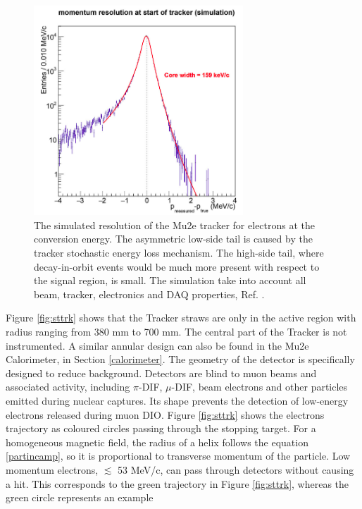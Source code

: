 \begin{figure}[!h]
    \centering
    \includegraphics[width =0.7\textwidth]{figures/png/Screenshot_20240330_104830.png}
    \caption{The simulated resolution of the Mu2e tracker for electrons at the
    conversion energy. The asymmetric low-side tail is caused by the tracker 
    stochastic energy loss mechanism. The high-side tail, where decay-in-orbit 
    events would be much more present with respect to the signal region, is small. 
    The simulation take into account all beam, tracker, electronics and DAQ 
    properties, Ref. \cite{bobbb}.}
    \label{fig:trkres}
    \end{figure}
Figure \ref{fig:sttrk} shows that the Tracker straws are only 
in the active region with radius ranging from 380 mm to 700 mm. 
The central part of the Tracker is not instrumented. A similar annular 
design can also be found in the Mu2e Calorimeter, in Section \ref{calorimeter}. 
The geometry of the detector is specifically designed to reduce background. 
Detectors are blind to muon beams and associated activity, including $\pi$-DIF, 
$\mu$-DIF, beam electrons and other particles emitted during nuclear captures. 
Its shape prevents the detection of low-energy electrons released during muon DIO. 
Figure \ref{fig:sttrk} shows the electrons trajectory as coloured circles passing 
through the stopping target. For a homogeneous magnetic field, the radius of a 
helix follows the equation \ref{partincamp}, so it is proportional to transverse 
momentum of the particle. Low momentum electrons, $\lesssim$ 53 MeV/c, can pass 
through detectors without causing a hit. This corresponds to the green trajectory 
in Figure \ref{fig:sttrk}, whereas the green circle represents an example 
